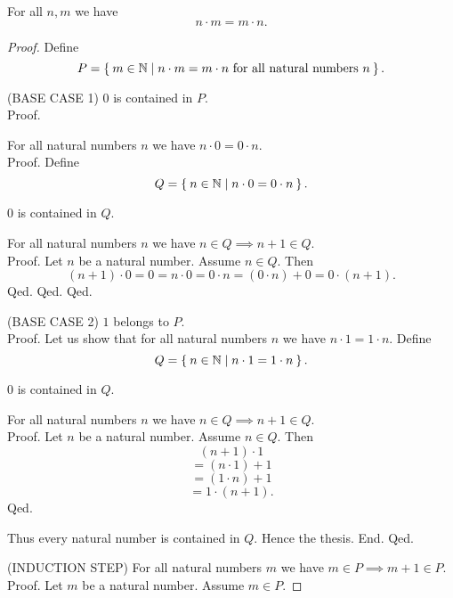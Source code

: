 \documentclass[../../arithmetic.ftl.tex]{subfiles}
\begin{document}
  \begin{forthel}
    \begin{proposition}\label{Arithmetic_01_03_850937}
      For all $n,m$ we have \[ n \cdot m = m \cdot n. \]
    \end{proposition}
    \begin{proof}
      Define \[ P = \Set{m \in \mathbb{N} | \text{$n \cdot m = m \cdot n$ for all natural numbers $n$}}. \]

      (BASE CASE 1) $0$ is contained in $P$. \\
      Proof.

        For all natural numbers $n$ we have $n \cdot 0 = 0 \cdot n$. \\
        Proof.
          Define \[ Q = \Set{n \in \mathbb{N} | n \cdot 0 = 0 \cdot n}. \]

          $0$ is contained in $Q$.

          For all natural numbers $n$ we have $n \in Q \implies n + 1 \in Q$. \\
          Proof.
            Let $n$ be a natural number.
            Assume $n \in Q$.
            Then
            \[
              (n + 1) \cdot 0
            = 0                 %
            = n \cdot 0         %
            = 0 \cdot n         %
            = (0 \cdot n) + 0   %
            = 0 \cdot (n + 1).  %
            \]
          Qed.
        Qed.
      Qed.

      (BASE CASE 2) $1$ belongs to $P$. \\
      Proof.
        Let us show that for all natural numbers $n$ we have $n \cdot 1 = 1 \cdot n$.
          Define \[ Q = \Set{n \in \mathbb{N} | n \cdot 1 = 1 \cdot n}. \]

          $0$ is contained in $Q$.

          For all natural numbers $n$ we have $n \in Q \implies n + 1 \in Q$. \\
          Proof.
            Let $n$ be a natural number.
            Assume $n \in Q$.
            Then
            \[   (n + 1) \cdot 1 \]
            \[ = (n \cdot 1) + 1 \]   %
            \[ = (1 \cdot n) + 1 \]   %
            \[ = 1 \cdot (n + 1). \]  %
          Qed.

          Thus every natural number is contained in $Q$.
          Hence the thesis.
        End.
      Qed.

      (INDUCTION STEP) For all natural numbers $m$ we have $m \in P \implies m + 1 \in P$. \\
      Proof.
        Let $m$ be a natural number.
        Assume $m \in P$.


\end{proof}
\end{forthel}
\end{document}
